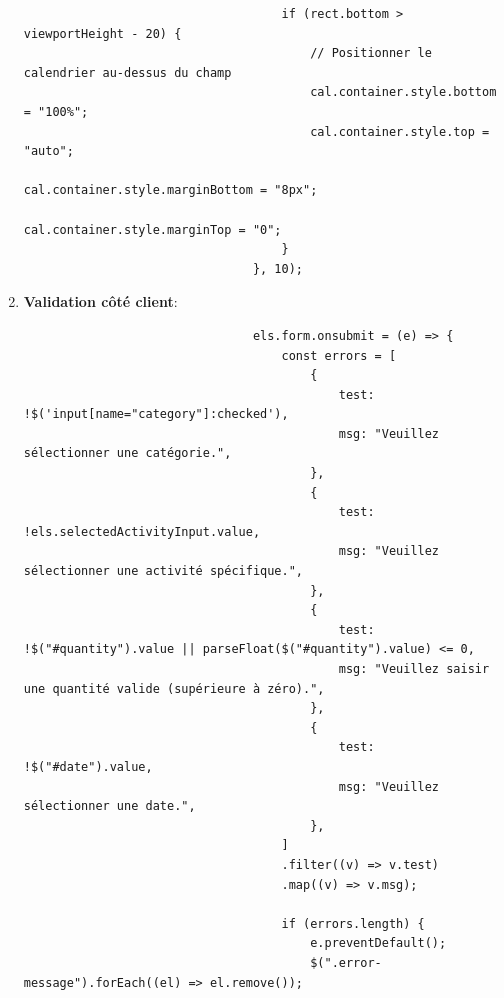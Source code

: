 \documentclass[a4paper,11pt]{article}
\begin{document}
\begin{enumerate}
\begin{tcolorbox}[colback=lightgray!5, colframe=gray!80, left=-65mm, right=5mm, top=2mm, bottom=0mm, boxrule=0.1mm]
\begin{verbatim}
                                    if (rect.bottom > viewportHeight - 20) {
                                        // Positionner le calendrier au-dessus du champ
                                        cal.container.style.bottom = "100%";
                                        cal.container.style.top = "auto";
                                        cal.container.style.marginBottom = "8px";
                                        cal.container.style.marginTop = "0";
                                    }
                                }, 10);
                            \end{verbatim}
                        \end{tcolorbox}

                    \item \textbf{Validation côté client}:
                        \begin{tcolorbox}[colback=lightgray!5, colframe=gray!80, left=-65mm, right=5mm, top=2mm, bottom=0mm, boxrule=0.1mm]
                            \begin{verbatim}
                                els.form.onsubmit = (e) => {
                                    const errors = [
                                        {
                                            test: !$('input[name="category"]:checked'),
                                            msg: "Veuillez sélectionner une catégorie.",
                                        },
                                        {
                                            test: !els.selectedActivityInput.value,
                                            msg: "Veuillez sélectionner une activité spécifique.",
                                        },
                                        {
                                            test: !$("#quantity").value || parseFloat($("#quantity").value) <= 0,
                                            msg: "Veuillez saisir une quantité valide (supérieure à zéro).",
                                        },
                                        {
                                            test: !$("#date").value,
                                            msg: "Veuillez sélectionner une date.",
                                        },
                                    ]
                                    .filter((v) => v.test)
                                    .map((v) => v.msg);

                                    if (errors.length) {
                                        e.preventDefault();
                                        $(".error-message").forEach((el) => el.remove());


\end{verbatim}
\end{tcolorbox}
\end{enumerate}
\end{document}
